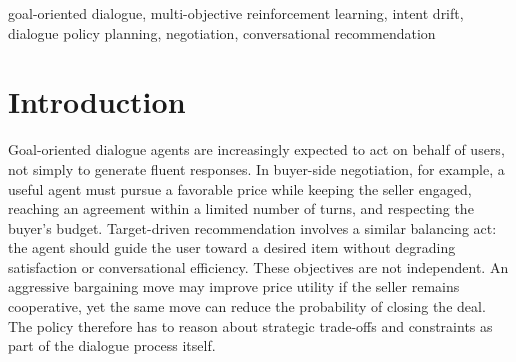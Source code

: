 \documentclass[conference]{IEEEtran}
\begin{document}
\begin{abstract}
Traditional goal-oriented dialog agents require inefficient retraining when new objectives arise. While recent multi-objective methods parameterize goals, they rely on rigid numerical preference vectors. This misaligns with real-world settings, where macro-goals are expressed in natural language, requiring strategic flexibility and non-negotiable constraints. Furthermore, existing policies ignore intent drift, maintaining static behavior rather than adapting to evolving dialog contexts. To address these gaps, we propose \textbf{ALMOND}, a novel hierarchical framework for learning dialog policies. A \textit{low-level policy} executes communication skills via a regret-based mechanism, prioritizing unmastered skills to bootstrap complex behaviors robustly. Concurrently, a \textit{high-level policy} adaptively selects short-term skills by monitoring intent shifts, leveraging strategic hints distilled during training to satisfy the overarching linguistic goal. Extensive experiments show ALMOND significantly outperforms baselines. Our framework achieves superior linguistic goal completion, minimizes constraint violations, drastically reduces adaptation latency, and establishes a new state-of-the-art for short-term success rates.
\end{abstract}

\begin{IEEEkeywords}
goal-oriented dialogue, multi-objective reinforcement learning, intent drift,
dialogue policy planning, negotiation, conversational recommendation
\end{IEEEkeywords}
\section{Introduction}

Goal-oriented dialogue agents are increasingly expected to act on behalf of
users, not simply to generate fluent responses. In buyer-side negotiation, for
example, a useful agent must pursue a favorable price while keeping the seller
engaged, reaching an agreement within a limited number of turns, and respecting
the buyer's budget. Target-driven recommendation involves a similar balancing
act: the agent should guide the user toward a desired item without degrading
satisfaction or conversational efficiency. These objectives are not independent.
An aggressive bargaining move may improve price utility if the seller remains
cooperative, yet the same move can reduce the probability of closing the deal.
The policy therefore has to reason about strategic trade-offs and constraints
as part of the dialogue process itself.
\end{document}
